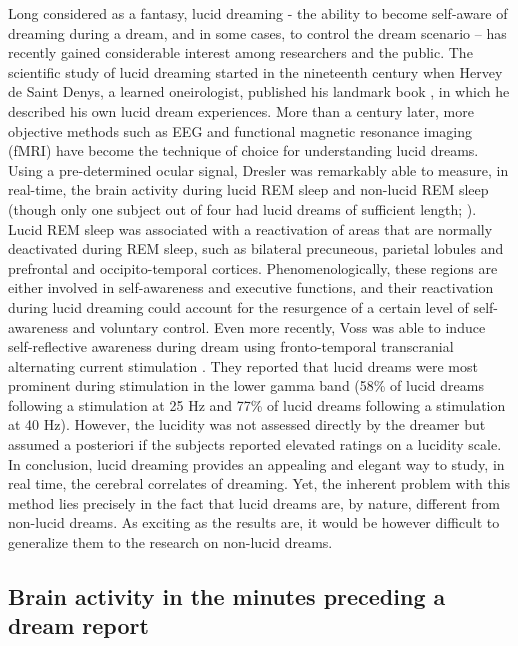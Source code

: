 Long considered as a fantasy, lucid dreaming - the ability to become self-aware of dreaming during a dream, and in some cases, to control the dream scenario – has recently gained considerable interest among researchers and the public. The scientific study of lucid dreaming started in the nineteenth century when Hervey de Saint Denys, a learned oneirologist, published his landmark book , in which he described his own lucid dream experiences. More than a century later, more objective methods such as EEG and functional magnetic resonance imaging (fMRI) have become the technique of choice for understanding lucid dreams. Using a pre-determined ocular signal, Dresler was remarkably able to measure, in real-time, the brain activity during lucid REM sleep and non-lucid REM sleep (though only one subject out of four had lucid dreams of sufficient length; \citet{dresler_neural_2012}). Lucid REM sleep was associated with a reactivation of areas that are normally deactivated during REM sleep, such as bilateral precuneous, parietal lobules and prefrontal and occipito-temporal cortices. Phenomenologically, these regions are either involved in self-awareness and executive functions, and their reactivation during lucid dreaming could account for the resurgence of a certain level of self-awareness and voluntary control. Even more recently, Voss was able to induce self-reflective awareness during dream using fronto-temporal transcranial alternating current stimulation \citep{voss_induction_2014}. They reported that lucid dreams were most prominent during stimulation in the lower gamma band (58\% of lucid dreams following a stimulation at 25 Hz and 77\% of lucid dreams following a stimulation at 40 Hz). However, the lucidity was not assessed directly by the dreamer but assumed a posteriori if the subjects reported elevated ratings on a lucidity scale. In conclusion, lucid dreaming provides an appealing and elegant way to study, in real time, the cerebral correlates of dreaming. Yet, the inherent problem with this method lies precisely in the fact that lucid dreams are, by nature, different from non-lucid dreams. As exciting as the results are, it would be however difficult to generalize them to the research on non-lucid dreams.

\subsection{Brain activity in the minutes preceding a dream report}
\label{sec:dream-research:attempts:ba-pre}

